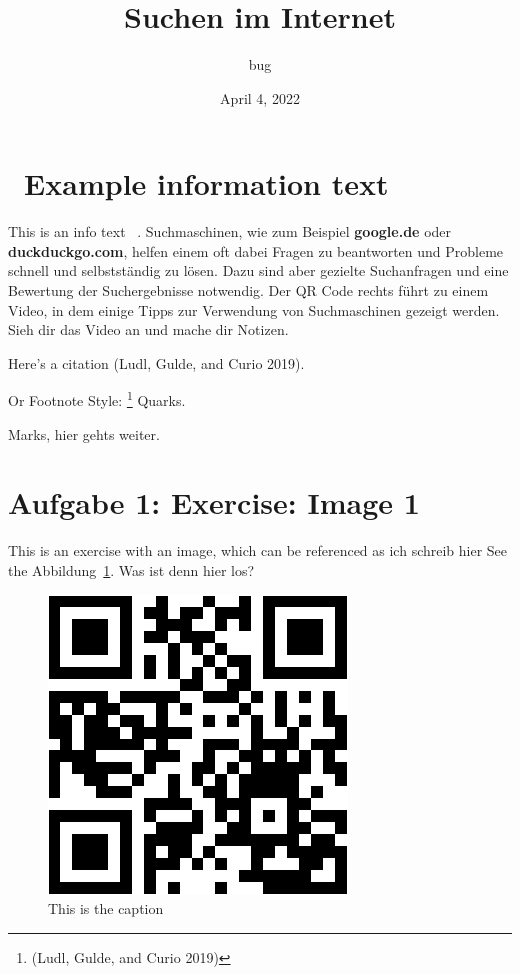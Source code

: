 \documentclass[
]{scrartcl}
\title{Suchen im Internet}
\author{bug}
\date{April 4, 2022}
\newcommand{\marginexercise}{\protect\marginnote{\hfill\Large\faIcon{pencil-alt}}}
\newcommand{\margininfo}{\protect\marginnote{\hfill\Large\faIcon[regular]{lightbulb}}}
\begin{document}
\hypertarget{example-information-text}{%
\section{\texorpdfstring{\margininfo~Example information
text}{Example information text}}\label{example-information-text}}

This is an info text
~. Suchmaschinen,
wie zum Beispiel \textbf{google.de} oder \textbf{duckduckgo.com}, helfen
einem oft dabei Fragen zu beantworten und Probleme schnell und
selbstständig zu lösen. Dazu sind aber gezielte Suchanfragen und eine
Bewertung der Suchergebnisse notwendig. Der QR Code rechts führt zu
einem Video, in dem einige Tipps zur Verwendung von Suchmaschinen
gezeigt werden. Sieh dir das Video an und mache dir Notizen.

Here's a citation (Ludl, Gulde, and Curio 2019).

Or Footnote Style: \footnote{(Ludl, Gulde, and Curio 2019)} Quarks.

Marks, hier gehts weiter.

\hypertarget{exercise-image}{%
\section{\texorpdfstring{\marginexercise Aufgabe 1: Exercise:
Image\hfill\normalsize{} 1}{Exercise: Image}}\label{exercise-image}}

This is an exercise with an image, which can be referenced as ich
schreib hier See the Abbildung~\ref{fig:qrcode}. Was ist denn hier los?

\begin{figure}
\hypertarget{fig:qrcode}{%
\centering
\includegraphics{qrcodeYouTubeVideo.png}
\caption{This is the caption}\label{fig:qrcode}
}
\end{figure}
\end{document}
